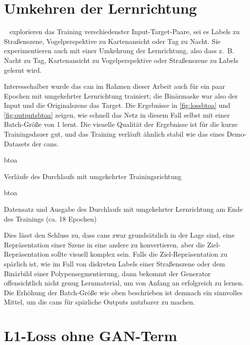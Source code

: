 \section{Umkehren der Lernrichtung}

\citeauthor{Isola.2017}~\cite{Isola.2017} explorieren das Training verschiedenster Input-Target-Paare, sei es Labels zu Straßenszene, Vogelperspektive zu Kartenansicht oder Tag zu Nacht.
Sie experimentieren auch mit einer Umkehrung der Lernrichtung, also dass z.~B. Nacht zu Tag, Kartenansicht zu Vogelperspektive oder Straßenszene zu Labels gelernt wird.

Interessehalber wurde das \gls{can} im Rahmen dieser Arbeit auch für ein paar Epochen mit umgekehrter Lernrichtung trainiert; die Binärmaske war also der Input und die Originalszene das Target.
Die Ergebnisse in \autoref{fig:lossbtoa} und \autoref{fig:outputsbtoa} zeigen, wie schnell das Netz in diesem Fall selbst mit einer Batch-Größe von 1 lernt.
Die visuelle Qualität der Ergebnisse ist für die kurze Trainingsdauer gut, und das Training verläuft ähnlich stabil wie das eines Demo-Datasets der \glspl{can}.

\begin{losseswoiou}{btoa}
	\caption{Verläufe des Durchlaufs mit umgekehrter Trainingsrichtung}
	\label{fig:lossbtoa}
\end{losseswoiou}

\begin{outputs}{btoa}
	\caption[Datensatz und Ausgabe des Durchlaufs mit umgekehrter Lernrichtung am Ende des Trainings]{Datensatz und Ausgabe des Durchlaufs mit umgekehrter Lernrichtung am Ende des Trainings (ca. 18 Epochen)}
	\label{fig:outputsbtoa}
\end{outputs}

Dies lässt den Schluss zu, dass \glspl{can} zwar grundsätzlich in der Lage sind, eine Repräsentation einer Szene in eine andere zu konvertieren, aber die Ziel-Repräsentation sollte visuell komplex sein.
Falls die Ziel-Repräsentation zu spärlich ist, wie im Fall von diskreten Labels einer Straßenszene oder dem Binärbild einer Polypensegmentierung, dann bekommt der Generator offensichtlich nicht genug Lernmaterial, um von Anfang an erfolgreich zu lernen.
Die Erhöhung der Batch-Größe wie oben beschrieben ist demnach ein sinnvolles Mittel, um die \glspl{can} für spärliche Outputs nutzbarer zu machen.



\section{L1-Loss ohne GAN-Term}

